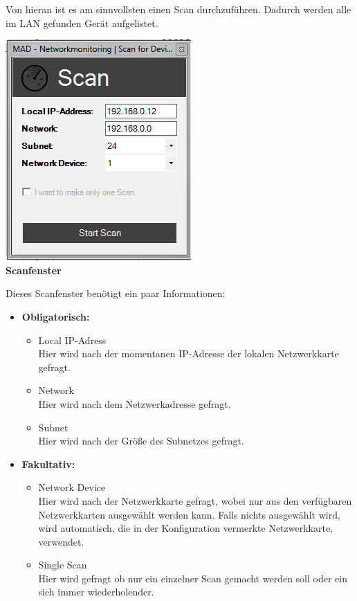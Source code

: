 \documentclass[12pt,a4paper]{report}
\begin{document}
\begin{onehalfspace}
Von hieran ist es am sinnvollsten einen Scan durchzuführen. Dadurch werden alle im LAN gefunden Gerät aufgelistet.
\begin{center}
\includegraphics[scale=0.7]{../docs/lyaton/graphics/GUI_v3_scan.png}\\
\textbf{Scanfenster}
\end{center}
Dieses Scanfenster benötigt ein paar Informationen:
\begin{itemize}
\item \textbf{Obligatorisch:}
\begin{itemize}
\item Local IP-Adress\\
Hier wird nach der momentanen IP-Adresse der lokalen Netzwerkkarte gefragt.
\item Network\\
Hier wird nach dem Netzwerkadresse gefragt.
\item Subnet\\
Hier wird nach der Größe des Subnetzes gefragt.
\end{itemize}
\item \textbf{Fakultativ:}
\begin{itemize}
\item Network Device\\
Hier wird nach der Netzwerkkarte gefragt, wobei nur aus den verfügbaren Netzwerkkarten ausgewählt werden kann. Falls nichts ausgewählt wird, wird automatisch, die in der Konfiguration vermerkte Netzwerkkarte, verwendet.
\item Single Scan\\
Hier wird gefragt ob nur ein einzelner Scan gemacht werden soll oder ein sich immer wiederholender.
\end{itemize}

\end{itemize}
\end{onehalfspace}
\end{document}
